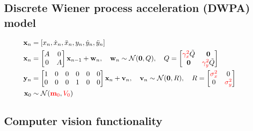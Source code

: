 \documentclass[12pt]{article}
\begin{document}
\subsection{Discrete Wiener process acceleration (DWPA) model}
\label{sec:dwpaModel}
\begin{align*}
    \mathbf{x}_n&=[x_n,\dot{x}_n,\ddot{x}_n,y_n,\dot{y}_n,\ddot{y}_n]\\
    \mathbf{x}_n&=\begin{bmatrix}
        A & 0 \\
        0 & A
           \end{bmatrix}
           \mathbf{x}_{n-1}+\mathbf{w}_n,\quad\mathbf{w}_n\sim\mathcal{N}(\mathbf{0},Q),\quad Q=\begin{bmatrix}
                                                                                                    \textcolor{red}{\gamma_x^2}\tilde Q & \mathbf{0}\\
                                                                                                    \mathbf{0} &
                                                                                                    \textcolor{red}{\gamma_y^2}\tilde Q
                                                                                                \end{bmatrix}\\
    \mathbf{y}_n&=\begin{bmatrix}
        1 & 0 & 0 & 0 & 0 &0\\
        0 & 0 & 0 & 1 & 0 &0\\
           \end{bmatrix}
           \mathbf{x}_n+\mathbf{v}_n,\quad\mathbf{v}_n\sim\mathcal{N}(\mathbf{0},R),\quad R=\begin{bmatrix}
                                                                                               \textcolor{red}{\sigma_x^2} & 0\\
                                                                                                0 & \textcolor{red}{\sigma_y^2}
                                                                                            \end{bmatrix}\\
    \mathbf{x}_0&\sim\mathcal{N}(\textcolor{red}{\mathbf{m}_0},\textcolor{red}{V_0})
\end{align*}

\subsection{Computer vision functionality}
\label{sec:openCV}
\end{document}
